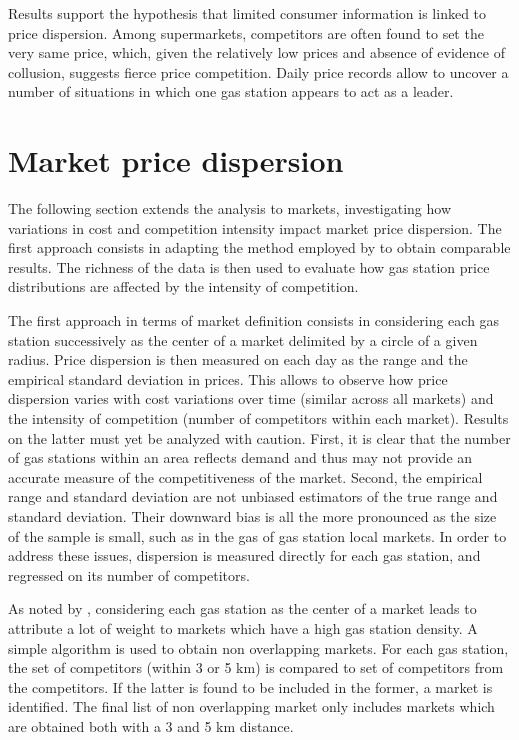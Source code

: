 \documentclass[english]{article}
\begin{document}
Results support the hypothesis that limited consumer information is linked to price dispersion. Among supermarkets, competitors are often found to set the very same price, which, given the relatively low prices and absence of evidence of collusion, suggests fierce price competition. Daily price records allow to uncover a number of situations in which one gas station appears to act as a leader.

\section{Market price dispersion}

The following section extends the analysis to markets, investigating how variations in cost and competition intensity impact market price dispersion. The first approach consists in adapting the method employed by \cite{TAP11} to obtain comparable results. The richness of the data is then used to evaluate how gas station price distributions are affected by the intensity of competition.

The first approach in terms of market definition consists in considering each gas station successively as the center of a market delimited by a circle of a given radius. Price dispersion is then measured on each day as the range and the empirical standard deviation in prices. This allows to observe how price dispersion varies with cost variations over time (similar across all markets) and the intensity of competition (number of competitors within each market). Results on the latter must yet be analyzed with caution. First, it is clear that the number of gas stations within an area reflects demand and thus may not provide an accurate measure of the competitiveness of the market. Second, the empirical range and standard deviation are not unbiased estimators of the true range and standard deviation. Their downward bias is all the more pronounced as the size of the sample is small, such as in the gas of gas station local markets. In order to address these issues, dispersion is measured directly for each gas station, and regressed on its number of competitors.

As noted by \cite{TAP11}, considering each gas station as the center of a market leads to attribute a lot of weight to markets which have a high gas station density. A simple algorithm is used to obtain non overlapping markets.  For each gas station, the set of competitors (within 3 or 5 km) is compared to set of competitors from the competitors. If the latter is found to be included in the former, a market is identified. The final list of non overlapping market only includes markets which are obtained both with a 3 and 5 km distance.
\end{document}
